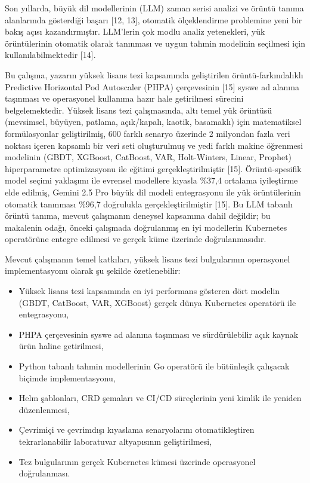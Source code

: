 \documentclass[12pt,a4paper]{article}
\begin{document}
Son yıllarda, büyük dil modellerinin (LLM) zaman serisi analizi ve örüntü tanıma alanlarında gösterdiği başarı [12, 13], otomatik ölçeklendirme problemine yeni bir bakış açısı kazandırmıştır. LLM'lerin çok modlu analiz yetenekleri, yük örüntülerinin otomatik olarak tanınması ve uygun tahmin modelinin seçilmesi için kullanılabilmektedir [14].

Bu çalışma, yazarın yüksek lisans tezi kapsamında geliştirilen örüntü-farkındalıklı Predictive Horizontal Pod Autoscaler (PHPA) çerçevesinin [15] syswe ad alanına taşınması ve operasyonel kullanıma hazır hale getirilmesi sürecini belgelemektedir. Yüksek lisans tezi çalışmasında, altı temel yük örüntüsü (mevsimsel, büyüyen, patlama, açık/kapalı, kaotik, basamaklı) için matematiksel formülasyonlar geliştirilmiş, 600 farklı senaryo üzerinde 2 milyondan fazla veri noktası içeren kapsamlı bir veri seti oluşturulmuş ve yedi farklı makine öğrenmesi modelinin (GBDT, XGBoost, CatBoost, VAR, Holt-Winters, Linear, Prophet) hiperparametre optimizasyonu ile eğitimi gerçekleştirilmiştir [15]. Örüntü-spesifik model seçimi yaklaşımı ile evrensel modellere kıyasla \%37,4 ortalama iyileştirme elde edilmiş, Gemini 2.5 Pro büyük dil modeli entegrasyonu ile yük örüntülerinin otomatik tanınması \%96,7 doğrulukla gerçekleştirilmiştir [15]. Bu LLM tabanlı örüntü tanıma, mevcut çalışmanın deneysel kapsamına dahil değildir; bu makalenin odağı, önceki çalışmada doğrulanmış en iyi modellerin Kubernetes operatörüne entegre edilmesi ve gerçek küme üzerinde doğrulanmasıdır.

Mevcut çalışmanın temel katkıları, yüksek lisans tezi bulgularının operasyonel implementasyonu olarak şu şekilde özetlenebilir:

\begin{itemize}[noitemsep]
  \item Yüksek lisans tezi kapsamında en iyi performans gösteren dört modelin (GBDT, CatBoost, VAR, XGBoost) gerçek dünya Kubernetes operatörü ile entegrasyonu,
  \item PHPA çerçevesinin syswe ad alanına taşınması ve sürdürülebilir açık kaynak ürün haline getirilmesi,
  \item Python tabanlı tahmin modellerinin Go operatörü ile bütünleşik çalışacak biçimde implementasyonu,
  \item Helm şablonları, CRD şemaları ve CI/CD süreçlerinin yeni kimlik ile yeniden düzenlenmesi,
  \item Çevrimiçi ve çevrimdışı kıyaslama senaryolarını otomatikleştiren tekrarlanabilir laboratuvar altyapısının geliştirilmesi,
  \item Tez bulgularının gerçek Kubernetes kümesi üzerinde operasyonel doğrulanması.
\end{itemize}
\end{document}
